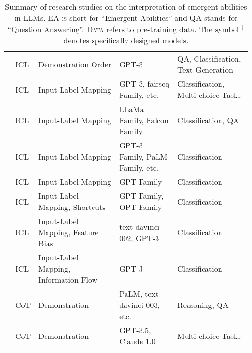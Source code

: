 \documentclass[11pt,a4paper]{article}
\begin{document}
\begin{table*}[t!]
{\begin{tabular}{lllll}
          \citep{Liu2021WhatMG} & ICL   & Demonstration Order & GPT-3 & QA, Classification, Text Generation \\
          \citep{Min2022RethinkingTR} & ICL   & Input-Label Mapping & GPT-3, fairseq Family, etc. & Classification, Multi-choice Tasks \\
          \citep{Kossen2023InContextLI} & ICL   & Input-Label Mapping &  LLaMa Family, Falcon Family & Classification, QA \\
          \citep{Wei2023LargerLM} & ICL   & Input-Label Mapping & GPT-3 Family, PaLM Family, etc. & Classification \\
          \citep{Kim2022GroundTruthLM} & ICL   & Input-Label Mapping & GPT Family & Classification \\
          \citep{Tang2023LargeLM} & ICL   & Input-Label Mapping, Shortcuts & GPT Family, OPT Family & Classification \\
          \citep{Si2023MeasuringIB} & ICL   & Input-Label Mapping, Feature Bias & text-davinci-002, GPT-3 & Classification \\
          \citep{Wang2023LabelWA} & ICL   & Input-Label Mapping, Information Flow & GPT-J & Classification \\
          \citep{Wang2022TowardsUC} & CoT   & Demonstration & PaLM, text-davinci-003, etc. & Reasoning, QA \\
          \citep{Turpin2023LanguageMD} & CoT   & Demonstration & GPT-3.5, Claude 1.0 & Multi-choice Tasks  \\
    \bottomrule
    \end{tabular}}%
\caption{Summary of research studies on the interpretation of emergent abilities in LLMs. EA is short for ``Emergent Abilities'' and QA stands for ``Question Answering''. \textsc{Data} refers to pre-training data. The symbol $^\dag$ denotes specifically designed models.}
  \label{tab:summ}%
\end{table*}%
\end{document}
